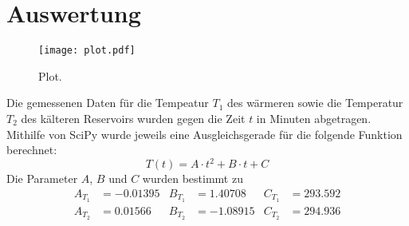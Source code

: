 \section{Auswertung}
\label{sec:Auswertung}

\begin{figure}
  \centering
  \texttt{[image: plot.pdf]}
  \caption{Plot.}
  \label{fig:plot}
\end{figure}
Die gemessenen Daten für die Tempeatur $T_1$ des wärmeren sowie die Temperatur
$T_2$ des kälteren Reservoirs wurden gegen die Zeit $t$ in Minuten abgetragen.
Mithilfe von SciPy wurde jeweils eine Ausgleichsgerade für die folgende Funktion
berechnet:
\begin{equation}
  T(t)=A \cdot t^2 + B \cdot t + C
\end{equation}
Die Parameter $A$, $B$ und $C$ wurden bestimmt zu
\begin{align}
  A_{T_1} &= -0.01395 & B_{T_1} &= 1.40708 & C_{T_1} &= 293.592 \\
  A_{T_2} &= 0.01566  & B_{T_2} &= -1.08915 & C_{T_2} &= 294.936
\end{align}
